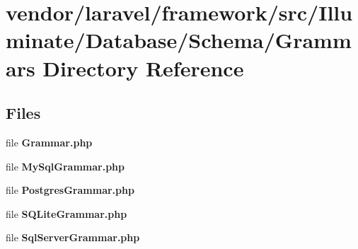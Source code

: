 \section{vendor/laravel/framework/src/\+Illuminate/\+Database/\+Schema/\+Grammars Directory Reference}
\label{dir_e437544fd9da84e73817b42affccab29}
\subsection*{Files}
\begin{DoxyCompactItemize}
\item 
file {\bf Grammar.\+php}
\item 
file {\bf My\+Sql\+Grammar.\+php}
\item 
file {\bf Postgres\+Grammar.\+php}
\item 
file {\bf S\+Q\+Lite\+Grammar.\+php}
\item 
file {\bf Sql\+Server\+Grammar.\+php}
\end{DoxyCompactItemize}

